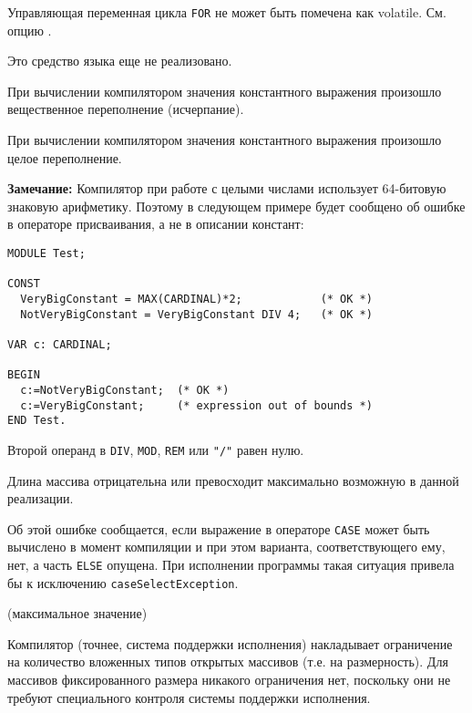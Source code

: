 Управляющая переменная цикла \verb'FOR' не может быть помечена как
volatile. См.  опцию .


Это средство языка еще не реализовано.


При вычислении компилятором значения константного выражения
произошло вещественное переполнение (исчерпание).


При вычислении компилятором значения константного выражения
произошло целое переполнение.

{\bf Замечание:} Компилятор при работе с целыми числами использует
64-битовую знаковую арифметику. Поэтому в следующем примере 
будет сообщено об ошибке в операторе присваивания, а не в описании констант:

\begin{verbatim}
MODULE Test;

CONST
  VeryBigConstant = MAX(CARDINAL)*2;            (* OK *)
  NotVeryBigConstant = VeryBigConstant DIV 4;   (* OK *)

VAR c: CARDINAL;

BEGIN
  c:=NotVeryBigConstant;  (* OK *)
  c:=VeryBigConstant;     (* expression out of bounds *)
END Test.
\end{verbatim}


Второй операнд в \verb'DIV', \verb'MOD', \verb'REM' или \verb'"/"' 
равен нулю.


Длина массива отрицательна или превосходит максимально возможную в
данной реализации.


Об этой ошибке сообщается, если выражение в операторе \verb'CASE'
может быть вычислено в момент компиляции и при этом варианта, 
соответствующего ему, нет, а часть \verb'ELSE' опущена. При исполнении
программы такая ситуация привела бы к исключению
\verb'caseSelectException'.

(максимальное значение)

Компилятор (точнее, система поддержки исполнения) накладывает ограничение
на количество вложенных типов открытых массивов (т.е. на размерность).
Для массивов фиксированного размера никакого ограничения нет, поскольку они 
не требуют специального контроля системы поддержки исполнения.

